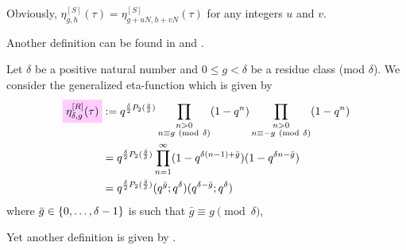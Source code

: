 \documentclass{article}
\begin{document}
Obviously, $\eta_{g,h}^{[S]}(\tau) = \eta_{g+uN,h+vN}^{[S]}(\tau)$ for
any integers $u$ and $v$.

Another definition can be found in
\cite{Robins:GeneralizedDedekindEtaProducts:1994} and
\cite{Chen+Du+Zhao:FindingModularFunctionsRamanujan:2019}.


\begin{Definition}
\cite{Robins:GeneralizedDedekindEtaProducts:1994}
Let $\delta$ be a positive natural number and $0 \le g < \delta$ be a
residue class (mod $\delta$).
%
We consider the generalized eta-function which is given by
\begin{align}
  \defineNotation[eta-delta-g-tau-Robins]{\eta_{\delta,g}^{[R]}(\tau)}
  &:=
  q^{\frac{\delta}{2}P_2(\frac{g}{\delta})}
  \prod_{\substack{n>0\\n\equiv g\ (\mathrm{mod}\ \delta)}} (1-q^n)
  \prod_{\substack{n>0\\n\equiv -g\ (\mathrm{mod}\ \delta)}} (1-q^n)
  \notag\\
  &=
  q^{\frac{\delta}{2}P_2(\frac{\bar{g}}{\delta})}
  \prod_{n=1}^\infty (1-q^{\delta (n-1)+\bar{g}})(1-q^{\delta n-\bar{g}})
  \notag\\
  &=
  q^{\frac{\delta}{2}P_2(\frac{\bar{g}}{\delta})}
  (q^{\bar{g}}; q^\delta) (q^{\delta-\bar{g}}; q^\delta)
  \label{eq:eta_delta-g^[R](tau)}
\end{align}
where $\bar{g}\in\left\{0,\ldots,\delta-1\right\}$ is such that
$\bar{g} \equiv g \pmod{\delta}$,
\end{Definition}


Yet another definition is given by
\cite{Yang:GeneralizedDedekindEtaFunctions:2004}.
\end{document}
